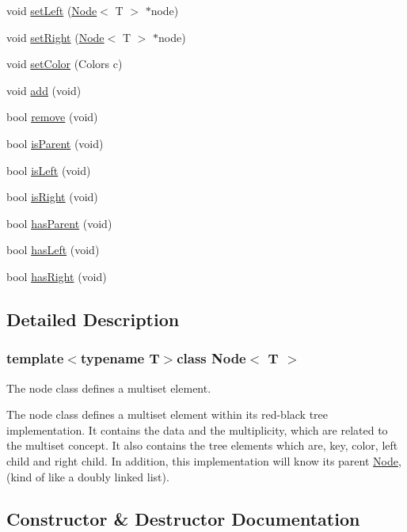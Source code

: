 \begin{DoxyCompactItemize}
\item 
void \hyperlink{class_node_a9afbeb2daea8798e71e9acc0967256a3}{set\+Left} (\hyperlink{class_node}{Node}$<$ T $>$ $\ast$node)
\item 
void \hyperlink{class_node_a1cf0e5397a347fee789c4b57dfb7624a}{set\+Right} (\hyperlink{class_node}{Node}$<$ T $>$ $\ast$node)
\item 
void \hyperlink{class_node_a96c1038d58f6f7089271afe3fa3e9288}{set\+Color} (Colors c)
\item 
void \hyperlink{class_node_aef85f7c8d30881449f35ac5fda836438}{add} (void)
\item 
bool \hyperlink{class_node_a2f77a48dceae8b8268826483f9671e1a}{remove} (void)
\item 
bool \hyperlink{class_node_ab0a293cb425b4f8be5f2d8efb08df1e8}{is\+Parent} (void)
\item 
bool \hyperlink{class_node_a614f99e8df6aebb91c9e17e204a8c170}{is\+Left} (void)
\item 
bool \hyperlink{class_node_ac8eeb9f7717618589d939491d87a04bf}{is\+Right} (void)
\item 
bool \hyperlink{class_node_af2f59b20b80ab306d379c785b3e95325}{has\+Parent} (void)
\item 
bool \hyperlink{class_node_aa03aef3064a78fd8de1d421bdbcdef57}{has\+Left} (void)
\item 
bool \hyperlink{class_node_ae7f5a8aff0b15f311397f9588a84101b}{has\+Right} (void)
\end{DoxyCompactItemize}


\subsection{Detailed Description}
\subsubsection*{template$<$typename T$>$class Node$<$ T $>$}

The node class defines a multiset element.

The node class defines a multiset element within it\textquotesingle{}s red-\/black tree implementation. It contains the data and the multiplicity, which are related to the multiset concept. It also contains the tree elements which are, key, color, left child and right child. In addition, this implementation will know it\textquotesingle{}s parent \hyperlink{class_node}{Node}, (kind of like a doubly linked list). 

\subsection{Constructor \& Destructor Documentation}
\hypertarget{class_node_a40d6e9db35a69683afc2a960f96c1109}{}

